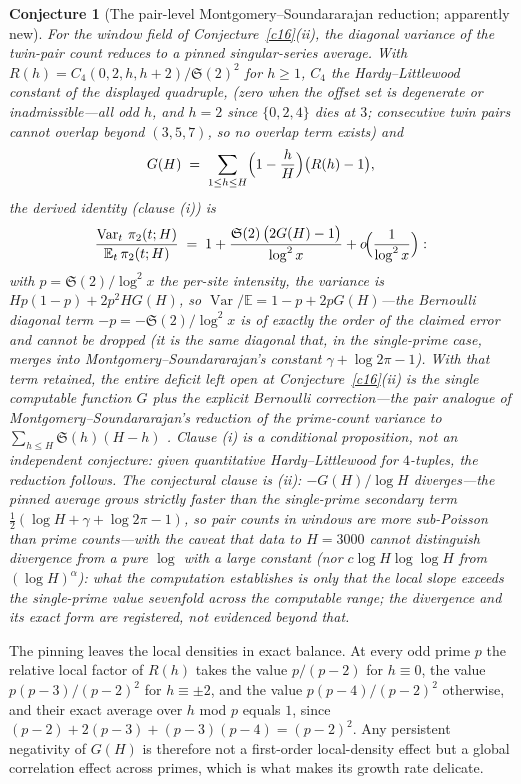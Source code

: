 \documentclass[11pt]{article}
\newtheorem{conjecture}{Conjecture}
\theoremstyle{definition}
\newcommand{\SG}{\mathfrak S}
\begin{document}
\setcounter{conjecture}{1}%
\begin{conjecture}[The pair-level Montgomery--Soundararajan reduction;
apparently new]\label{c12}
For the window field of Conjecture~\ref{c16}(ii), the diagonal
variance of the twin-pair count reduces to a \emph{pinned}
singular-series average.  With $R(h)=C_4(0,2,h,h+2)/\SG(2)^2$ for $h\ge1$, $C_4$ the Hardy--Littlewood constant of the displayed quadruple, (zero when the offset set
is degenerate or inadmissible---all odd $h$, and $h=2$ since
$\{0,2,4\}$ dies at $3$; consecutive twin pairs cannot overlap beyond
$(3,5,7)$, so no overlap term exists) and
\[
G(H)\;=\;\sum_{1\le h\le H}\Bigl(1-\frac hH\Bigr)\bigl(R(h)-1\bigr),
\]
the derived identity (clause \emph{(i)}) is
\[
\frac{\operatorname{Var}_t\,\pi_2(t;H)}{\mathbb E_t\,\pi_2(t;H)}
\;=\;1+\frac{\SG(2)\,\bigl(2G(H)-1\bigr)}{\log^2x}
+o\!\Bigl(\frac1{\log^2 x}\Bigr):
\]
with $p=\SG(2)/\log^2x$ the per-site intensity, the variance is
$Hp(1-p)+2p^2HG(H)$, so $\operatorname{Var}/\mathbb E=1-p+2pG(H)$---the Bernoulli diagonal term $-p=-\SG(2)/\log^2x$ is of exactly
the order of the claimed error and cannot be dropped (it is the same
diagonal that, in the single-prime case, merges into
Montgomery--Soundararajan's constant $\gamma+\log2\pi-1$).  With
that term retained, the entire deficit left open at
Conjecture~\ref{c16}(ii) is
the single computable function $G$ plus the explicit Bernoulli
correction---the pair analogue of
Montgomery--Soundararajan's reduction of the prime-count variance to
$\sum_{h\le H}\SG(h)(H-h)$ \cite{MS}.  Clause (i) is a
\emph{conditional proposition}, not an independent conjecture: given
quantitative Hardy--Littlewood for $4$-tuples, the reduction
follows.  The conjectural clause is (ii): $-G(H)/\log H$ diverges---the pinned average grows strictly faster than the single-prime
secondary term $\tfrac12(\log H+\gamma+\log2\pi-1)$, so pair counts
in windows are more sub-Poisson than prime counts---with the caveat that
data to $H=3000$ cannot distinguish divergence from a pure
$\log$ with a large constant
(nor $c\log H\log\log H$ from $(\log H)^\alpha$): what the
computation \emph{establishes} is only that the local slope exceeds
the single-prime value sevenfold across the computable range; the
divergence and its exact form are registered, not evidenced beyond
that.
\end{conjecture}

The pinning leaves the local densities in exact balance.  At every
odd prime $p$ the relative local factor of $R(h)$ takes the value
$p/(p-2)$ for $h\equiv0$, the value $p(p-3)/(p-2)^2$ for
$h\equiv\pm2$, and the value $p(p-4)/(p-2)^2$ otherwise, and their
exact average over $h$ mod $p$ equals $1$, since
$(p-2)+2(p-3)+(p-3)(p-4)=(p-2)^2$.  Any persistent negativity of
$G(H)$ is therefore not a first-order local-density effect but a
global correlation effect across primes, which is what makes its
growth rate delicate.
\end{document}
